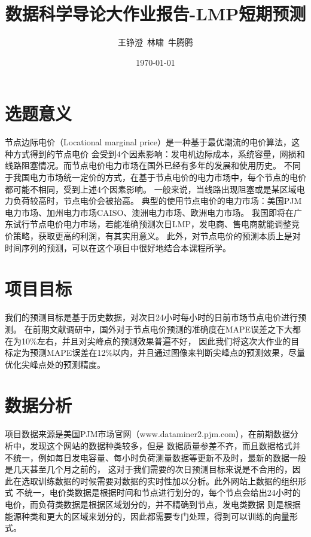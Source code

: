 \documentclass[UTF-8, 10pt]{ctexart}
\title{数据科学导论大作业报告-LMP短期预测}
\author{王铮澄\ 林啸\ 牛腾腾}
\date{\today}
\begin{document}
        \maketitle
            \section{选题意义}
                \indent{}节点边际电价（Locational marginal price）是一种基于最优潮流的电价算法，这种方式得到的节点电价
                会受到4个因素影响：发电机边际成本，系统容量，网损和线路阻塞情况。而节点电价电力市场在国外已经有多年的发展和使用历史。
                不同于我国电力市场统一定价的方式，在基于节点电价的电力市场中，每个节点的电价都可能不相同，受到上述4个因素影响。
                一般来说，当线路出现阻塞或是某区域电力负荷较高时，节点电价会被抬高。
                典型的使用节点电价的电力市场：美国PJM电力市场、加州电力市场CAISO、澳洲电力市场、欧洲电力市场。
                我国即将在广东试行节点电价电力市场，若能准确预测次日LMP，发电商、售电商就能调整竞价策略，获取更高的利润，有其实用意义。
                此外，对节点电价的预测本质上是对时间序列的预测，可以在这个项目中很好地结合本课程所学。\\
            
            \section{项目目标}我们的预测目标是基于历史数据，对次日24小时每小时的日前市场节点电价进行预测。
            在前期文献调研中，国外对于节点电价预测的准确度在MAPE误差之下大都在为10\%左右，并且对尖峰点的预测效果普遍不好，
            因此我们将这次大作业的目标定为预测MAPE误差在12\%以内，并且通过图像来判断尖峰点的预测效果，尽量优化尖峰点处的预测精度。\\
            
            \section{数据分析}
                \indent{}项目数据来源是美国PJM市场官网（www.dataminer2.pjm.com），在前期数据分析中，发现这个网站的数据种类较多，但是
                数据质量参差不齐，而且数据格式并不统一，例如每日发电容量、每小时负荷测量数据等更新不及时，最新的数据一般是几天甚至几个月之前的，
                这对于我们需要的次日预测目标来说是不合用的，因此在选取训练数据的时候需要对数据的实时性加以分析。此外网站上数据的组织形式
                不统一，电价类数据是根据时间和节点进行划分的，每个节点会给出24小时的电价，而负荷类数据是根据区域划分的，并不精确到节点，发电类数据
                则是根据能源种类和更大的区域来划分的，因此都需要专门处理，得到可以训练的向量形式。\\
\end{document}
